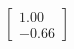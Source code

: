 \documentclass[preview]{standalone}
\begin{document}
\begin{align*}
\begin{bmatrix} 1.00 \\ -0.66 \end{bmatrix}
\end{align*}
\end{document}
